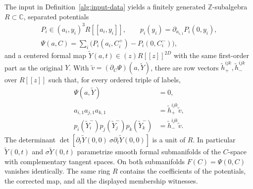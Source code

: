 \begin{theorem}
\label{alg:formal-data}
The input in Definition~\ref{alg:input-data} yields a finitely generated
$\mathbb Z$-subalgebra $R\subset\mathbb C$, separated potentials
\[
 \begin{gathered}
 P_i\in(a_i,y_i)^3R[[a_i,y_i]],\qquad
 p_i(y_i)=\partial_{a_{i,1}}P_i(0,y_i),\\
 \Psi(a,C)=\sum_i\bigl(P_i(a_i,C_i^+)-P_i(0,C_i^-)\bigr),
 \end{gathered}
\]
and a centered formal map
$\widetilde Y(a,t)\in(z)R[[z]]^{2D}$ with the same first-order part as
the original $Y$. With
$\widetilde v=(\partial_C\Psi)(a,\widetilde Y)$, there are row vectors
$\widetilde h_+^{ijk},\widetilde h_-^{ijk}$ over $R[[z]]$ such that,
for every ordered triple of labels,
\begin{equation}
 \begin{split}
  \Psi(a,\widetilde Y)&=0,\\
  a_{i,1}a_{j,1}a_{k,1}&=\widetilde h_+^{ijk}\widetilde v,\\
  p_i(\widetilde Y_i^-)
  p_j(\widetilde Y_j^-)
  p_k(\widetilde Y_k^-)&=\widetilde h_-^{ijk}\widetilde v.
 \end{split}
 \label{alg:seven}
\end{equation}
The determinant
$\det[\partial_t\widetilde Y(0,0)\ \sigma\partial_t\widetilde Y(0,0)]$
is a unit of $R$. In particular $\widetilde Y(0,t)$ and
$\sigma\widetilde Y(0,t)$ parametrize smooth formal submanifolds
of the $C$-space with complementary tangent spaces. On both
submanifolds $F(C)=\Psi(0,C)$ vanishes identically.
The same ring $R$ contains the coefficients of the potentials, the
corrected map, and all the displayed membership witnesses.
\end{theorem}

